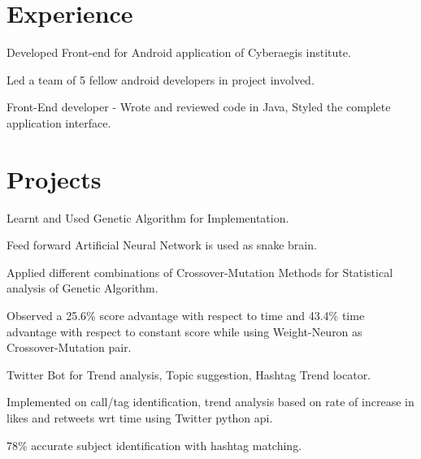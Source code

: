 \documentclass[]{deedy-resume-openfont}
\begin{document}
\hfill
\begin{minipage}[t]{0.66\textwidth} 


\section{Experience}
\vspace{\topsep} %
\begin{tightemize}
\item Developed Front-end for Android application of Cyberaegis institute.
\item Led a team of 5 fellow android developers in project involved. 
\item Front-End developer - Wrote and reviewed code in Java, Styled the complete application interface. 
\end{tightemize}
\sectionsep


\section{Projects}
\begin{tightemize}
\item Learnt and Used Genetic Algorithm for Implementation.
\item Feed forward Artificial Neural Network is used as snake brain.
\item Applied different combinations of Crossover-Mutation Methods for Statistical analysis of Genetic Algorithm. 
\item Observed a 25.6\% score advantage with respect to time and 43.4\% time advantage with respect to constant score while using Weight-Neuron as Crossover-Mutation pair. 
\end{tightemize}  

\begin{tightemize}
\item Twitter Bot for Trend analysis, Topic suggestion, Hashtag Trend locator.
\item Implemented on call/tag identification, trend analysis based on rate of increase in likes and retweets wrt time using Twitter python api.
\item 78\% accurate subject identification with hashtag matching. 
\end{tightemize}  


\end{minipage}
\end{document}
